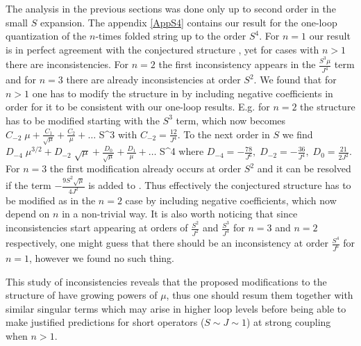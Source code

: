 The analysis in the previous sections was done only up to second order in the small $S$ expansion. The appendix \ref{AppS4} contains our result for the
one-loop quantization of the $n$-times folded string up to the order $S^4$. For $n=1$ our result is in perfect agreement with the conjectured structure , yet for cases with $n>1$ there are inconsistencies.
For $n=2$ the first inconsistency appears in the $\frac{S^3\mu}{J^4}$ term and for $n=3$ there are already inconsistencies at order $S^2$. We found that for $n>1$ one has to modify the structure in  by
including negative coefficients in order for it to be consistent with our one-loop results. E.g. for $n=2$ the structure has to be modified starting with the $S^3$ term, which now becomes
\beq
\(
C_{-2}\;\mu+\frac{C_1}{\sqrt\mu}+\frac{C_2}{\mu}+\dots
\) S^3
\eeq
with $C_{-2}=\frac{12}{J^4}$. To the next order in $S$ we find
\beq
\(
D_{-4}\;\mu^{3/2} +D_{-2}\;\sqrt{\mu}+ \frac{D_{0}}{\sqrt\mu}+\frac{D_1}{\mu}+\dots
\) S^4
\eeq
where $D_{-4}=-\frac{78}{J^6},\;D_{-2}=-\frac{36}{J^4},\;D_0=\frac{21}{2J^2}$.
For $n=3$ the first modification already occurs at order $S^2$ and it can be resolved if the term $-\frac{9 S^2\sqrt\mu}{4 J^2}$ is added to .
Thus effectively the conjectured structure  has to be modified as in the $n=2$ case by including negative coefficients, which now depend on $n$ in a non-trivial way.
It is also worth noticing that since inconsistencies start appearing at orders of $\frac{S^2}{J^2}$ and $\frac{S^3}{J^4}$ for $n=3$ and $n=2$ respectively, one might guess that
there should be an inconsistency at order $\frac{S^4}{J^6}$ for $n=1$, however we found no such thing.

This study of inconsistencies reveals that the proposed modifications to the structure of  have growing powers of $\mu$,
thus one should resum them together with similar singular terms which may arise in higher loop levels before being able to make justified predictions
for short operators ($S\sim J\sim 1$) at strong coupling when $n>1$.




